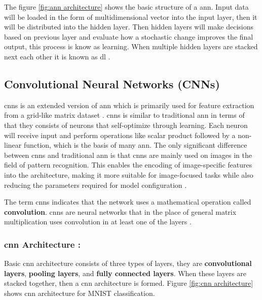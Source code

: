 The figure \ref{fig:ann architecture} shows the basic structure of a \gls{ann}. Input data will be loaded in the form of multidimensional vector into the input layer, then it will be distributed into the hidden layer. Then hidden layers will make decisions based on previous layer and evaluate how a stochastic change improves the final output, this process is know as learning. When multiple hidden layers are stacked next each other it is known as \gls{dl} \cite{oshea2015introductionconvolutionalneuralnetworks}.

\subsection{Convolutional Neural Networks (CNNs)}

\glspl{cnn}\cite{726791} is an extended version of \gls{ann} which is primarily used for feature extraction from a grid-like matrix dataset \cite{GeeksforGeeks2024}. \glspl{cnn} is similar to traditional \gls{ann} in terms of that they consists of neurons that self-optimize through learning. Each neuron will receive input and perform operations like scalar product followed by a non-linear function, which is the basis of many \gls{ann}. The only significant difference between \glspl{cnn} and traditional \gls{ann} is that \glspl{cnn} are mainly used on images in the field of pattern recognition. This enables the encoding of image-specific features into the architecture, making it more suitable for image-focused tasks while also reducing the parameters required for model configuration \cite{oshea2015introductionconvolutionalneuralnetworks}.

The term \glspl{cnn} indicates that the network uses a mathematical operation called \textbf{convolution}. \glspl{cnn} are neural networks that in the place of general matrix multiplication uses convolution in at least one of the layers \cite{Goodfellow-et-al-2016}.

\subsubsection*{\gls{cnn} Architecture :}

Basic \gls{cnn} architecture consists of three types of layers, they are \textbf{convolutional layers}, \textbf{pooling layers}, and \textbf{fully connected layers}. When these layers are stacked together, then a \gls{cnn} architecture is formed. Figure \ref{fig:cnn architecture} shows \gls{cnn} architecture for MNIST\cite{6296535} classification.


